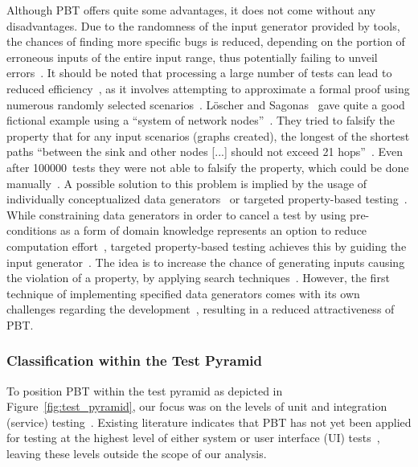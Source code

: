 \documentclass[runningheads]{llncs}
\begin{document}
Although PBT offers quite some advantages, it does not come without any disadvantages. Due to the randomness of the input generator provided by tools, the chances of finding more specific bugs is reduced, depending on the portion of erroneous inputs of the entire input range, thus potentially failing to unveil errors~\cite{Loescher2017,Padhye2019,ElazarMittelman2023,Shi2023}. It should be noted that processing a large number of tests can lead to reduced efficiency~\cite{ElazarMittelman2023,Shi2023}, as it involves attempting to approximate a formal proof using numerous randomly selected scenarios~\cite{Fink1997,ElazarMittelman2023,Paraskevopoulou2015}. Löscher and Sagonas~\cite{Loescher2017} gave quite a good fictional example using a ``system of network nodes''~\cite{Loescher2017}. They tried to falsify the property that for any input scenarios (graphs created), the longest of the shortest paths ``between the sink and other nodes [...] should not exceed 21 hops''~\cite{Loescher2017}. Even after 100000~tests they were not able to falsify the property, which could be done manually~\cite{Loescher2017}. A possible solution to this problem is implied by the usage of individually conceptualized data generators~\cite{Loescher2017,ElazarMittelman2023,Shi2023,Paraskevopoulou2015,Claessen2000} or targeted property-based testing~\cite{Loescher2017}. While constraining data generators in order to cancel a test by using pre-conditions as a form of domain knowledge represents an option to reduce computation effort~\cite{Loescher2017,ElazarMittelman2023,Shi2023}, targeted property-based testing achieves this by guiding the input generator~\cite{Loescher2017}. The idea is to increase the chance of generating inputs causing the violation of a property, by applying search techniques~\cite{Loescher2017}. However, the first technique of implementing specified data generators comes with its own challenges regarding the development~\cite{Loescher2017,ElazarMittelman2023,Shi2023}, resulting in a reduced attractiveness of PBT.

\subsubsection{Classification within the Test Pyramid}
To position PBT within the test pyramid as depicted in Figure~\ref{fig:test_pyramid}, our focus was on the levels of unit and integration (service) testing~\cite{Aniche2022,Radziwill2020}. Existing literature indicates that PBT has not yet been applied for testing at the highest level of either system or user interface (UI) tests~\cite{Radziwill2020,Aniche2022}, leaving these levels outside the scope of our analysis.
\end{document}
